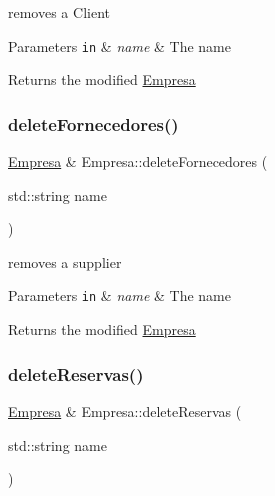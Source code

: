 removes a Client 


\begin{DoxyParams}[1]{Parameters}
\mbox{\tt in}  & {\em name} & The name\\
\hline
\end{DoxyParams}
\begin{DoxyReturn}{Returns}
the modified \hyperlink{classEmpresa}{Empresa} 
\end{DoxyReturn}
\mbox{\label{classEmpresa_ab8b7dda77caceec58e464c16b7e45f7c}} 
\subsubsection{\texorpdfstring{delete\+Fornecedores()}{deleteFornecedores()}}
{\footnotesize\ttfamily \hyperlink{classEmpresa}{Empresa} \& Empresa\+::delete\+Fornecedores (\begin{DoxyParamCaption}\item[{std\+::string}]{name }\end{DoxyParamCaption})}



removes a supplier 


\begin{DoxyParams}[1]{Parameters}
\mbox{\tt in}  & {\em name} & The name\\
\hline
\end{DoxyParams}
\begin{DoxyReturn}{Returns}
the modified \hyperlink{classEmpresa}{Empresa} 
\end{DoxyReturn}
\mbox{\label{classEmpresa_a079c008b006f56faac3c1016fe770e8c}} 
\subsubsection{\texorpdfstring{delete\+Reservas()}{deleteReservas()}}
{\footnotesize\ttfamily \hyperlink{classEmpresa}{Empresa} \& Empresa\+::delete\+Reservas (\begin{DoxyParamCaption}\item[{std\+::string}]{name }\end{DoxyParamCaption})}



